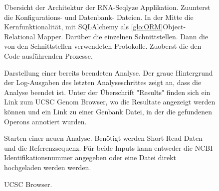 \documentclass[a4paper]{thesis}
\begin{document}
\begin{figure}[h]\centering
{}
\caption[Applikationsarchitektur]{
	Übersicht der Architektur der RNA-Seqlyze Applikation.
	Zuunterst die Konfigurations- und Datenbank- Dateien.
	In der Mitte die Kernfunktionalität, mit SQLAlchemy
	als \ref{glo:ORM}{Object-Relational Mapper}.
        Darüber die einzelnen Schnittstellen.
	Dann die von den Schnittstellen verwendeten Protokolle.
	Zuoberst die den Code ausführenden Prozesse.
}
\label{fig:arch}
\end{figure}
%
\begin{figure}[h]\centering
{}
\caption[Screenshot 1]{
	Darstellung einer bereits beendeten Analyse. Der graue Hintergrund
	der Log-Ausgaben des letzten Analyseschrittes zeigt an, dass die
	Analyse beendet ist. Unter der Überschrift "Results" finden sich
	ein Link zum UCSC Genom Browser, wo die Resultate angezeigt werden
	können und ein Link zu einer Genbank Datei, in der die gefundenen
	Operons annotiert wurden.
}
\label{fig:screen1}
\end{figure}
%
\begin{figure}[h]\centering
{}
\caption[Screenshot 2]{
	Starten einer neuen Analyse. Benötigt werden Short Read Daten und
	die Referenzsequenz. Für beide Inputs kann entweder die NCBI
	Identifikationsnummer angegeben oder eine Datei direkt
	hochgeladen werden werden.
}
\label{fig:screen2}
\end{figure}
%
\begin{figure}[h]\centering
{}
\caption[Screenshot 3]{
	UCSC Browser.
}
\label{fig:screen3}
\end{figure}
%
\FloatBarrier
\end{document}
